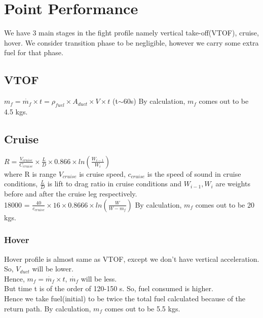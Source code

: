 \section{Point Performance}
We have 3 main stages in the fight profile namely vertical take-off(VTOF), cruise, hover. We consider transition phase to be negligible, however we carry some extra fuel for that phase. 
\subsection{VTOF}
$m_f = \dot{m_f}\times t = \rho_{fuel}\times A_{duct}\times V \times t$ (t$\sim$60s)
By calculation, $m_f$ comes out to be 4.5 kgs.
\subsection{Cruise}
$R = \frac{V_{cruise}}{C_{cruise}}\times\frac{L}{D}\times0.866 \times ln(\frac{W_{i-1}}{W_i})$ \\
where R is range $V_{cruise}$ is cruise speed, $c_{cruise}$ is the speed of sound in cruise conditions, $\frac{L}{D}$ is lift to drag ratio in cruise conditions and $W_{i-1}, W_i$ are weights before and after the cruise leg respectively.\\
18000 = $\frac{40}{c_{cruise}}\times16\times0.8666\times ln(\frac{W}{W - m_f})$
By calculation, $m_f$ comes out to be 20 kgs.
\subsubsection{Hover}
Hover profile is almost same as VTOF, except we don't have vertical acceleration.\\
So, $V_{duct}$ will be lower.\\
Hence, $m_f = \dot{m_f}\times t$, $\dot{m_f}$ will be less.\\
But time t is of the order of 120-150 s. So, fuel consumed is higher.\\
Hence we take fuel(initial) to be twice the total fuel calculated because of the return path.
By calculation, $m_f$ comes out to be 5.5 kgs.
